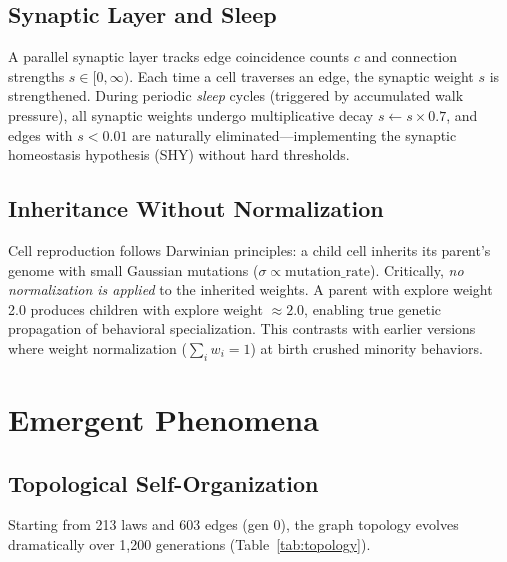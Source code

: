 \documentclass[aps,prl,reprint]{revtex4-2}
\begin{document}
\subsection{Synaptic Layer and Sleep}

A parallel synaptic layer tracks edge coincidence counts $c$ and connection
strengths $s \in [0, \infty)$. Each time a cell traverses an edge, the
synaptic weight $s$ is strengthened. During periodic \emph{sleep} cycles
(triggered by accumulated walk pressure), all synaptic weights undergo
multiplicative decay $s \leftarrow s \times 0.7$, and edges with $s < 0.01$
are naturally eliminated---implementing the synaptic homeostasis hypothesis
(SHY) without hard thresholds.

\subsection{Inheritance Without Normalization}

Cell reproduction follows Darwinian principles: a child cell inherits its
parent's genome with small Gaussian mutations ($\sigma \propto
\text{mutation\_rate}$). Critically, \emph{no normalization is applied} to
the inherited weights. A parent with explore weight 2.0 produces children with
explore weight $\approx 2.0$, enabling true genetic propagation of behavioral
specialization. This contrasts with earlier versions where weight
normalization ($\sum_i w_i = 1$) at birth crushed minority behaviors.

\section{Emergent Phenomena}

\subsection{Topological Self-Organization}

Starting from 213 laws and 603 edges (gen 0), the graph topology evolves
dramatically over 1,200 generations (Table~\ref{tab:topology}).
\end{document}
